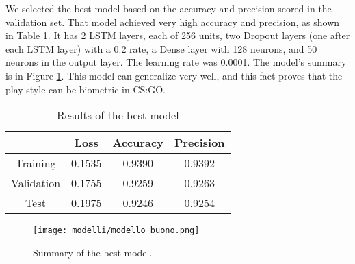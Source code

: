 	We selected the best model based on the accuracy and precision scored in the validation set. 
	That model achieved very high accuracy and precision, as shown in Table \ref{tab:res}. 
	It has 2 LSTM layers, each of 256 units, two Dropout layers (one after each LSTM layer) with a 0.2 rate, a Dense layer with 128 neurons, and 50 neurons in the output layer. 
	The learning rate was 0.0001. 
	The model's summary is in Figure \ref{fig:best_mod}. 
	This model can generalize very well, and this fact proves that the play style can be biometric in CS:GO.
		
	\begin{table}[!h]
		
		\caption{\label{tab:res}Results of the best model}
	
		\centering
		\begin{tabular}{|c|c|c|c|}
		
			\hline
			 & \textbf{Loss} & \textbf{Accuracy} & \textbf{Precision} \\
			\hline
			Training & 0.1535 & 0.9390 & 0.9392 \\
			\hline
			Validation & 0.1755 & 0.9259 & 0.9263 \\
			\hline
			Test & 0.1975 & 0.9246 & 0.9254 \\
			\hline
			 
		\end{tabular}
		
	\end{table}
	
	\begin{figure}[t!]
		\centering
		\texttt{[image: modelli/modello\_buono.png]}
		\caption{\label{fig:best_mod}Summary of the best model.}
	\end{figure}
	
	\null
	\vfill